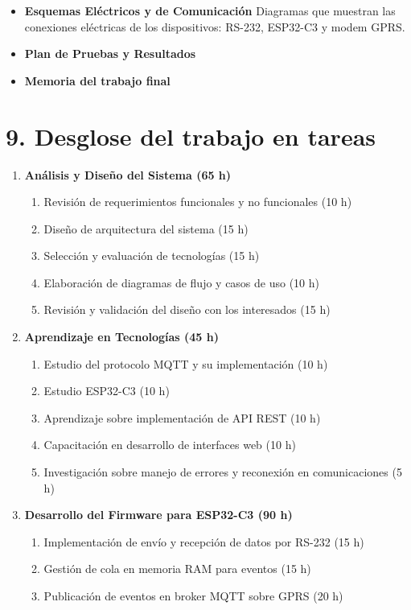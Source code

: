 \documentclass[
11pt, %
]{charter}
\begin{document}
\begin{itemize}
\item \textbf{Esquemas Eléctricos y de Comunicación}
Diagramas que muestran las conexiones eléctricas de los dispositivos: RS-232, ESP32-C3 y modem GPRS.
\item \textbf{Plan de Pruebas y Resultados}
\item \textbf{Memoria del trabajo final}

\end{itemize}


\section{9. Desglose del trabajo en tareas}
\label{sec:wbs}

\begin{enumerate}
\item \textbf{Análisis y Diseño del Sistema (65 h)}
\begin{enumerate}
\item Revisión de requerimientos funcionales y no funcionales (10 h)
\item Diseño de arquitectura del sistema (15 h)
\item Selección y evaluación de tecnologías (15 h)
\item Elaboración de diagramas de flujo y casos de uso (10 h)
\item Revisión y validación del diseño con los interesados (15 h)
\end{enumerate}
\item \textbf{Aprendizaje en Tecnologías (45 h)}
\begin{enumerate}
\item Estudio del protocolo MQTT y su implementación (10 h)
\item Estudio ESP32-C3 (10 h)
\item Aprendizaje sobre implementación de API REST (10 h)
\item Capacitación en desarrollo de interfaces web (10 h)
\item Investigación sobre manejo de errores y reconexión en comunicaciones (5 h)
\end{enumerate}
\item \textbf{Desarrollo del Firmware para ESP32-C3 (90 h)}
\begin{enumerate}
\item Implementación de envío y recepción de datos por RS-232 (15 h)
\item Gestión de cola en memoria RAM para eventos (15 h)
\item Publicación de eventos en broker MQTT sobre GPRS (20 h)

\end{enumerate}
\end{enumerate}
\end{document}

